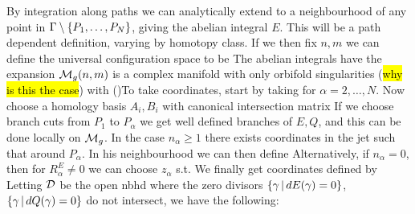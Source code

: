 \documentclass{article}
\begin{document}
By integration along paths we can analytically extend to a neighbourhood of any point in $\Gamma\setminus\left\{ P_1, \dots, P_N \right\}$, giving the abelian integral $E$. This will be a path dependent definition, varying by homotopy class. If we then fix $n,m$ we can define the universal configuration space to be 
The abelian integrals have the expansion
$\mathcal{M}_g(n,m)$ is a complex manifold with only orbifold singularities (\hl{why is this the case}) with 
()To take coordinates, start by taking 
for $\alpha = 2, \dots, N$. Now choose a homology basis $A_i,B_i$ with canonical intersection matrix 
If we choose branch cuts from $P_1$ to $P_\alpha$ we get well defined branches of $E,Q$, and this can be done locally on $\mathcal{M}_g$. In the case $n_\alpha \geq 1$ there exists coordinates in the jet such that 
around $P_\alpha$. In his neighbourhood we can then define 
Alternatively, if $n_\alpha = 0$, then for $R_\alpha^E \neq 0$ we can choose $z_\alpha$ s.t.
We finally get coordinates defined by 
Letting $\mathcal{D}$ be the open nbhd where the zero divisors $\left\{ \gamma \, | \, dE(\gamma) = 0 \right\}$, $\left\{ \gamma \, | \, dQ(\gamma) = 0 \right\}$ do not intersect, we have the following: 
\end{document}

